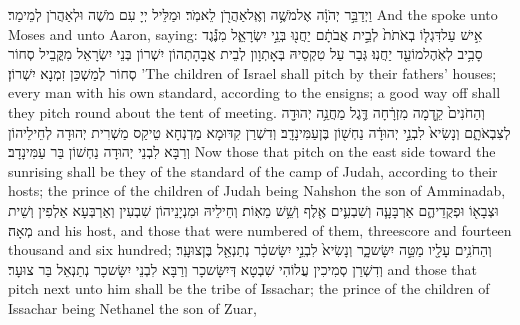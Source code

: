\newperek
{}%
{וַיְדַבֵּ֣ר יְהֹוָ֔ה אֶל\maqqaf מֹשֶׁ֥ה וְאֶֽל\maqqaf אַהֲרֹ֖ן לֵאמֹֽר׃}
{וּמַלֵּיל יְיָ עִם מֹשֶׁה וּלְאַהֲרֹן לְמֵימַר׃}
{And the \lord\space spoke unto Moses and unto Aaron, saying:}{}
{אִ֣ישׁ עַל\maqqaf דִּגְל֤וֹ בְאֹתֹת֙ לְבֵ֣ית אֲבֹתָ֔ם יַחֲנ֖וּ בְּנֵ֣י יִשְׂרָאֵ֑ל מִנֶּ֕גֶד סָבִ֥יב לְאֹֽהֶל\maqqaf מוֹעֵ֖ד יַחֲנֽוּ׃}
{גְּבַר עַל טִקְסֵיהּ בְּאָתְוָון לְבֵית אֲבָהָתְהוֹן יִשְׁרוֹן בְּנֵי יִשְׂרָאֵל מִקֳּבֵיל סְחוֹר סְחוֹר לְמַשְׁכַּן זִמְנָא יִשְׁרוֹן׃}
{’The children of Israel shall pitch by their fathers’ houses; every man with his own standard, according to the ensigns; a good way off shall they pitch round about the tent of meeting.}{}
{וְהַחֹנִים֙ קֵ֣דְמָה מִזְרָ֔חָה דֶּ֛גֶל מַחֲנֵ֥ה יְהוּדָ֖ה לְצִבְאֹתָ֑ם וְנָשִׂיא֙ לִבְנֵ֣י יְהוּדָ֔ה נַחְשׁ֖וֹן בֶּן\maqqaf עַמִּינָדָֽב׃}
{וְדִשְׁרַן קִדּוּמָא מַדְנְחָא טֵיקַס מַשְׁרִית יְהוּדָה לְחֵילֵיהוֹן וְרַבָּא לִבְנֵי יְהוּדָה נַחְשׁוֹן בַּר עַמִּינָדָב׃}
{Now those that pitch on the east side toward the sunrising shall be they of the standard of the camp of Judah, according to their hosts; the prince of the children of Judah being Nahshon the son of Amminadab,}{}
{וּצְבָא֖וֹ וּפְקֻדֵיהֶ֑ם אַרְבָּעָ֧ה וְשִׁבְעִ֛ים אֶ֖לֶף וְשֵׁ֥שׁ מֵאֽוֹת׃}
{וְחֵילֵיהּ וּמִנְיָנֵיהוֹן שִׁבְעִין וְאַרְבְּעָא אַלְפִין וְשֵׁית מְאָה׃}
{and his host, and those that were numbered of them, threescore and fourteen thousand and six hundred;}{}
{וְהַחֹנִ֥ים עָלָ֖יו מַטֵּ֣ה יִשָּׂשכָ֑ר וְנָשִׂיא֙ לִבְנֵ֣י יִשָּׂשכָ֔ר נְתַנְאֵ֖ל בֶּן\maqqaf צוּעָֽר׃}
{וְדִשְׁרַן סְמִיכִין עֲלוֹהִי שִׁבְטָא דְּיִשָּׂשכָר וְרַבָּא לִבְנֵי יִשָּׂשכָר נְתַנְאֵל בַּר צוּעָר׃}
{and those that pitch next unto him shall be the tribe of Issachar; the prince of the children of Issachar being Nethanel the son of Zuar,}{}
